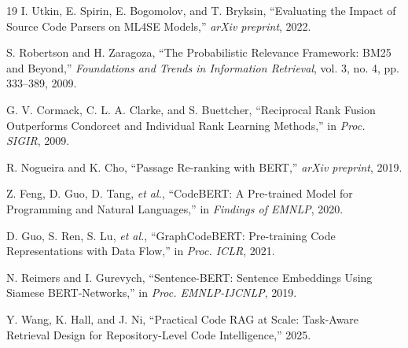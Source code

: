 \documentclass[conference]{IEEEtran}
\begin{document}
\begin{thebibliography}{19}
I. Utkin, E. Spirin, E. Bogomolov, and T. Bryksin, ``Evaluating the Impact of Source Code Parsers on ML4SE Models,'' \textit{arXiv preprint}, 2022.

S. Robertson and H. Zaragoza, ``The Probabilistic Relevance Framework: BM25 and Beyond,'' \textit{Foundations and Trends in Information Retrieval}, vol. 3, no. 4, pp. 333--389, 2009.

G. V. Cormack, C. L. A. Clarke, and S. Buettcher, ``Reciprocal Rank Fusion Outperforms Condorcet and Individual Rank Learning Methods,'' in \textit{Proc. SIGIR}, 2009.

R. Nogueira and K. Cho, ``Passage Re-ranking with BERT,'' \textit{arXiv preprint}, 2019.

Z. Feng, D. Guo, D. Tang, \textit{et al.}, ``CodeBERT: A Pre-trained Model for Programming and Natural Languages,'' in \textit{Findings of EMNLP}, 2020.

D. Guo, S. Ren, S. Lu, \textit{et al.}, ``GraphCodeBERT: Pre-training Code Representations with Data Flow,'' in \textit{Proc. ICLR}, 2021.

N. Reimers and I. Gurevych, ``Sentence-BERT: Sentence Embeddings Using Siamese BERT-Networks,'' in \textit{Proc. EMNLP-IJCNLP}, 2019.

Y. Wang, K. Hall, and J. Ni, ``Practical Code RAG at Scale: Task-Aware Retrieval Design for Repository-Level Code Intelligence,'' 2025.
\end{thebibliography}
\end{document}
